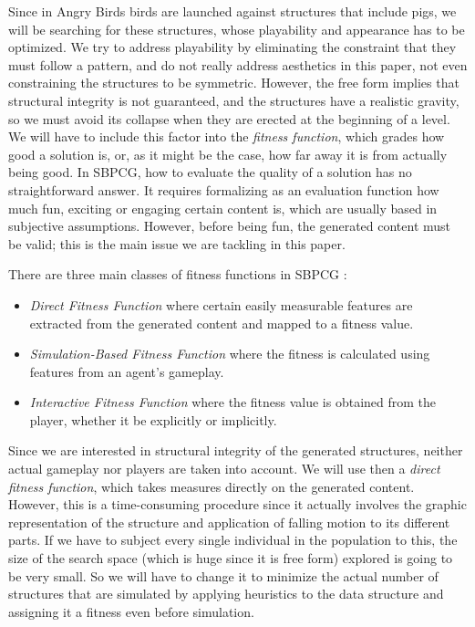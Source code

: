 \documentclass[runningheads,a4paper]{llncs}
\begin{document}
Since in Angry Birds birds are
launched against structures that include pigs, we will be searching
for these structures, whose playability and appearance has to be
optimized. We try to address playability by eliminating the constraint
that they must follow a pattern, and do not really address aesthetics
in this paper, not even constraining the structures to be
symmetric. However, the free form implies that structural integrity is
not guaranteed, and the structures have a realistic
gravity, so we must avoid its collapse when they are erected at the
beginning of a level. We will have to include this factor into the 
\textit{fitness function}, which grades how good a solution is, or, as
it might be the case, how far away it is from actually being good.
In SBPCG, how to evaluate the quality of a solution has no straightforward 
answer. It requires formalizing as an evaluation function how much fun, 
exciting or engaging certain content is, which are usually based in subjective 
assumptions. However, before being fun, the generated content must be
valid; this is the main issue we are tackling in this paper.

There are three main classes of fitness functions in 
SBPCG \cite{togelius2010search}:

\begin{itemize}
	\item \textit{Direct Fitness Function} where certain easily measurable 
	features are extracted from the generated content and mapped to a 
	fitness value.
	\item \textit{Simulation-Based Fitness Function} where the 
	fitness is calculated using features from an agent's gameplay. 
	\item \textit{Interactive Fitness Function} where the fitness value is 
	obtained from the player, whether it be explicitly or 
	implicitly. 
\end{itemize}

Since we are interested in structural integrity of the generated
structures, neither actual gameplay nor players are taken into
account. We will use then a {\em direct fitness function}, which takes
measures directly on the generated content. However, this is a
time-consuming procedure since it actually involves the graphic
representation of the structure and application of falling motion to
its different parts. If we have to subject every single individual in
the population to this, the size of the search space (which is huge
since it is free form) explored is going to be very small. So we will
have to change it to minimize the actual number of structures that are
simulated by applying heuristics to the data structure and assigning
it a fitness even before simulation.
\end{document}
